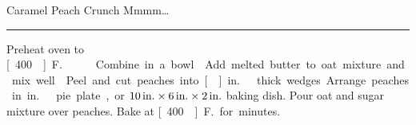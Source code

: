 \begin{recipe}{Caramel Peach Crunch}{}{}
\freeform  Mmmm\ldots\\
\rule{\textwidth}{0.05pt}
\newstep Preheat oven to \unit[400\0]{F.}
Combine in a bowl.
Add melted butter to oat mixture and mix well.
Peel and cut peaches into \unit[]{in.}\ thick wedges.  Arrange peaches in \unit[9]{in.}\ pie plate, or $\unit[10]{in.}\times \unit[6]{in.}\times \unit[2]{in.}$ baking dish.
\newstep Pour oat and sugar mixture over peaches.
\newstep Bake at \unit[400\0]{F.} for \unit[25--30]{minutes}.
\end{recipe}
